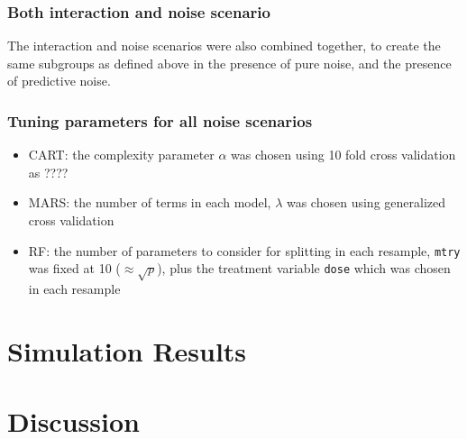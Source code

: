 \documentclass[12pt]{article}
\begin{document}


\subsubsection{Both interaction and noise scenario} %
\label{ssub:subsubsection_name}

The interaction and noise scenarios were also combined together, to create the same subgroups as defined above in the presence of pure noise, and the presence of predictive noise.


\subsubsection{Tuning parameters for all noise scenarios} %
\label{ssub:tuning_parameters_for_all_noise_scenarios}

\begin{itemize}
  \item CART: the complexity parameter $\alpha$ was chosen using 10 fold cross validation as ????
  \item MARS: the number of terms in each model, $\lambda$ was chosen using generalized cross validation
  \item RF: the number of parameters to consider for splitting in each resample, \texttt{mtry} was fixed at 10 ($\approx \sqrt{p}$), plus the treatment variable \texttt{dose} which was chosen in each resample
\end{itemize}





\section{Simulation Results} %
\label{sec:simulation_results}


\section{Discussion} %
\label{sec:discussion}

\end{document}
